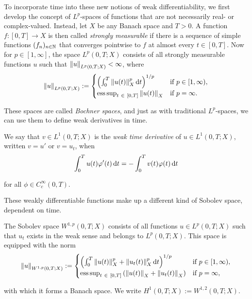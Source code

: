 To incorporate time into these new notions of weak differentiability, we first develop the concept of $L^p$-spaces of functions that are not necessarily real- or complex-valued. Instead, let $X$ be any Banach space and $T > 0$. A function $f: [0, T] \to X$ is then called \emph{strongly measurable} if there is a sequence of simple functions $(f_n)_{n \in \mathbb{N}}$ that converges pointwise to $f$ at almost every $t \in [0, T]$. Now for $p \in [1, \infty]$, the space $L^{p}(0, T; X)$ consists of all strongly measurable functions $u$ such that $\left\| u \right\|_{L^p(0, T; X)} < \infty$, where
%
\begin{equation*}
    \left\| u \right\|_{L^p(0, T; X)} := \begin{cases}
        \left( \int_0^T \left\| u(t) \right\|_X^p \mathop{}\!\mathrm{d} t \right)^{1/p}  & \text{if } p \in [1, \infty), \\
        \operatorname*{ess\,sup}_{t\ \in\ [0, T]} \left\| u(t) \right\|_X              & \text{if } p = \infty. 
    \end{cases}
\end{equation*}

\noindent
These spaces are called \emph{Bochner spaces}, and just as with traditional $L^p$-spaces, we can use them to define weak derivatives in time.

\begin{definition}{}{}
    We say that $v \in L^1(0, T; X)$ is the \emph{weak time derivative} of $u \in L^1(0, T; X)$, written $v = u'$ or $v = u_t$, when
%
    \begin{equation*}
        \int_{0}^{T} u(t) \varphi'(t) \mathop{}\!\mathrm{d} t = - \int_{0}^{T} v(t) \varphi(t) \mathop{}\!\mathrm{d} t
    \end{equation*}

    \noindent
    for all $\phi \in C_c^\infty(0, T)$.
\end{definition}

\noindent
These weakly differentiable functions make up a different kind of Sobolev space, dependent on time.

\begin{definition}{}{}
    The Sobolev space $W^{1, p}(0, T; X)$ consists of all functions $u \in L^p(0, T; X)$ such that $u_t$ exists in the weak sense and belongs to $L^p(0, T; X)$. This space is equipped with the norm
%
    \begin{equation*}
        \left\| u \right\|_{W^{1, p}(0, T; X)} := \begin{cases}
        \left( \int_0^T \left\| u(t) \right\|_X^p + \left\| u_t(t) \right\|_X^p \mathop{}\!\mathrm{d} t \right)^{1/p}  & \text{if } p \in [1, \infty), \\
        \operatorname*{ess\,sup}_{t\ \in\ [0, T]} \left( \left\| u(t) \right\|_X + \left\| u_t(t) \right\|_X \right)              & \text{if } p = \infty,
    \end{cases}
    \end{equation*}

    \noindent
    with which it forms a Banach space. We write $H^1(0, T; X) := W^{1, 2}(0, T; X)$.
\end{definition}

